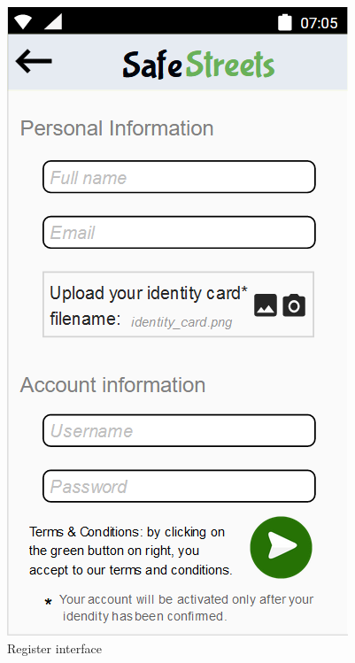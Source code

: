         \begin{figure}[h]
        \centering
        \includegraphics[scale=0.5]{Images/register.png}
        \caption{Register interface}
    \end{figure}
